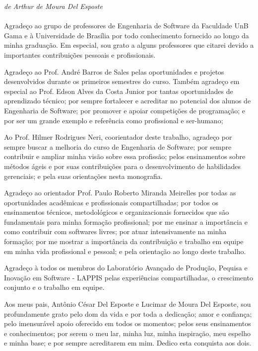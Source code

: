 \begin{agradecimentos}

%

\emph{de Arthur de Moura Del Esposte} \\ \\

%

Agradeço ao grupo de professores de Engenharia de Software da Faculdade UnB Gama e à Universidade de Brasília por todo conhecimento fornecido ao longo da minha graduação. Em especial, sou grato a alguns professores que citarei devido a importantes contribuições pessoais e profissionais.

%

Agradeço ao Prof. André Barros de Sales pelas oportunidades e projetos desenvolvidos durante os primeiros semestres do curso. Também agradeço em especial ao Prof. Edson Alves da Costa Junior por tantas oportunidades de aprendizado técnico; por sempre fortalecer e acreditar no potencial dos alunos de Engenharia de Software; por promover e apoiar competições de programação; e por ser um grande exemplo e referência como profissional e ser-humano;

%

Ao Prof. Hilmer Rodrigues Neri, coorientador deste trabalho, agradeço por sempre buscar a melhoria do curso de Engenharia de Software; por sempre contribuir e ampliar minha visão sobre essa profissão; pelos ensinamentos sobre métodos ágeis e por suas contribuições para o desenvolvimento de habilidades gerenciais; e pela suas orientações nesta monografia.

%

Agradeço ao orientador Prof. Paulo Roberto Miranda Meirelles por todas as oportunidades acadêmicas e profissionais compartilhadas; por todos os ensinamentos técnicos, metodológicos e organizacionais fornecidos que são fundamentais para minha formação profissional; por me ensinar a importância e como contribuir com softwares livres; por atuar intensivamente na minha formação; por me mostrar a importância da contribuição e trabalho em equipe em minha vida profissional e pessoal; e pela orientação ao longo deste trabalho.

%

Agradeço à todos os membros do Laboratório Avançado de Produção, Pequisa e Inovação em Software - LAPPIS pelas experiências compartilhadas, o crescimento conjunto e o trabalho em equipe.

%

Aos meus pais, Antônio César Del Esposte e Lucimar de Moura Del Esposte, sou profundamente grato pelo dom da vida e por toda a dedicação; amor e confiança; pelo imensurável apoio oferecido em todos os momentos; pelos seus ensinamentos e conhecimentos; por serem o meu lar, minha luz, minha inspiração, meu espelho e minha base; e por sempre acreditarem em mim. Dedico esta conquista aos dois.


\end{agradecimentos}
